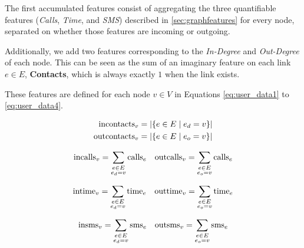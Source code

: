 The first accumulated features consist of aggregating the three quantifiable features (\emph{Calls}, \emph{Time}, and \emph{SMS}) described in \cref{sec:graphfeatures} for every node, separated on whether those features are incoming or outgoing.

Additionally, we add two features corresponding to the \emph{In-Degree} and \emph{Out-Degree} of each node. This can be seen as the sum of an imaginary feature on each link $e \in E$, \textbf{Contacts}, which is always exactly $1$ when the link exists.

These features are defined for each node $v \in V$ in Equations \eqref{eq:user_data1} to  \eqref{eq:user_data4}.

\begin{equation}
\begin{gathered}
\begin{aligned}
\operatorname{incontacts}_v &= \left| \left\{ e \in E \mid e_d = v \right\} \right| \\
\operatorname{outcontacts}_v &= \left| \left\{ e \in E \mid e_o = v \right\} \right|
\end{aligned}
\end{gathered}
\label{eq:user_data1}
\end{equation}

\begin{equation}
\begin{aligned}
\operatorname{incalls}_v &= \sum_{\substack{e \in E \\ e_d = v}} \operatorname{calls}_e &
\operatorname{outcalls}_v &= \sum_{\substack{e \in E \\ e_o = v}} \operatorname{calls}_e \\
\end{aligned}
\label{eq:user_data2}
\end{equation}

\begin{equation}
\begin{aligned}
\operatorname{intime}_v &= \sum_{\substack{e \in E \\ e_d = v}} \operatorname{time}_e &
\operatorname{outtime}_v &= \sum_{\substack{e \in E \\ e_o = v}} \operatorname{time}_e \\
\end{aligned}
\label{eq:user_data3}
\end{equation}

\begin{equation}
\begin{aligned}
\operatorname{insms}_v &= \sum_{\substack{e \in E \\ e_d = v}} \operatorname{sms}_e &
\operatorname{outsms}_v &= \sum_{\substack{e \in E \\ e_o = v}} \operatorname{sms}_e \\
\end{aligned}
\label{eq:user_data4}
\end{equation}


